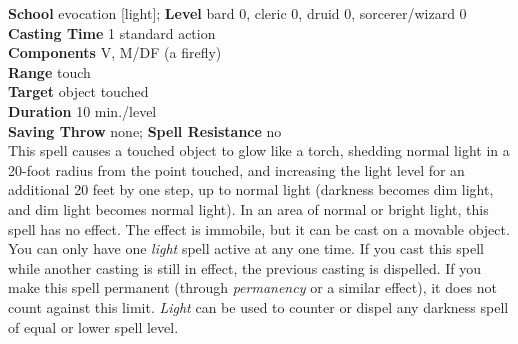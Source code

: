 \textbf{School }evocation [light]; \textbf{Level }bard 0, cleric 0, druid 0, sorcerer/wizard 0\\
\textbf{Casting Time }1 standard action\\
\textbf{Components }V, M/DF (a firefly)\\
\textbf{Range }touch\\
\textbf{Target }object touched\\
\textbf{Duration }10 min./level\\
\textbf{Saving Throw} none; \textbf{Spell Resistance} no\\
This spell causes a touched object to glow like a torch, shedding normal light in a 20-foot radius from the point touched, and increasing the light level for an additional 20 feet by one step, up to normal light (darkness becomes dim light, and dim light becomes normal light). In an area of normal or bright light, this spell has no effect. The effect is immobile, but it can be cast on a movable object.\\
You can only have one \textit{light} spell active at any one time. If you cast this spell while another casting is still in effect, the previous casting is dispelled. If you make this spell permanent (through \textit{permanency} or a similar effect), it does not count against this limit. \textit{Light }can be used to counter or dispel any darkness spell of equal or lower spell level.\\
